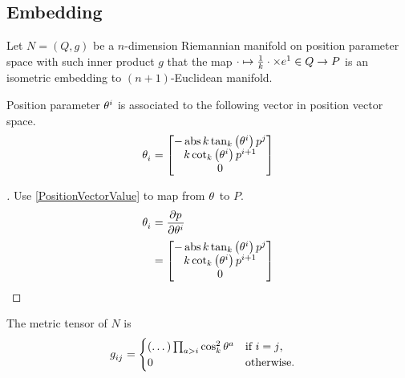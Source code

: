 \documentclass[stu, babel, american, biblatex, a4paper, leqno, draftall]{apa7}
\begin{document}
\subsection{Embedding}
\begin{definition}\label{Embedding}
    Let $N=\left(Q,g\right)$ be a $n$-dimension Riemannian manifold
    on position parameter space with such inner product $g$ that
    the map $\cdot\mapsto\frac{1}{k}\cdot\times\tensor{e}{^1}\in Q\to P$ is an isometric embedding to $\left(n+1\right)$-Euclidean manifold.
\end{definition}
\begin{lemma}\label{Model:Basis}
    Position parameter $\tensor{\theta}{^i}$ is associated to the following vector in position vector space.
    \begin{equation*}
        \tensor{\theta}{_i} =
        \begin{bmatrix}
            -\abs{k}\tan_k\left(\tensor{\theta}{^i}\right)\tensor{p}{^j} \\
            k\cot_k\left(\tensor{\theta}{^i}\right)\tensor{p}{^{i+1}}    \\
            0                                                            \\
        \end{bmatrix}
    \end{equation*}
\end{lemma}
\begin{proof}[]
    \skipped

    Use \cref{PositionVectorValue} to map from $\tensor{\theta}{}$ to $P$.
    \begin{align*}
        {\tensor{\theta}{_i}}
         & =
        \frac{\partial\tensor{p}{}}{\partial\tensor{\theta}{^i}} \\
         & =
        \begin{bmatrix}
            -\abs{k}\tan_k\left(\tensor{\theta}{^i}\right)\tensor{p}{^j} \\
            k\cot_k\left(\tensor{\theta}{^i}\right)\tensor{p}{^{i+1}}    \\
            0                                                            \\
        \end{bmatrix}
    \end{align*}
\end{proof}
\begin{lemma}\label{Model:MetricTensor}
    The metric tensor of $N$ is
    \begin{align*}
        \tensor{g}{_i_j} & =
        \begin{cases}
            \left(\dots\right)\prod_{a>i}{\cos_k^2{\tensor{\theta}{^a}}} & \text{if $i=j$,}  \\
            0                                                            & \text{otherwise.} \\
        \end{cases}
    \end{align*}
\end{lemma}
\end{document}
